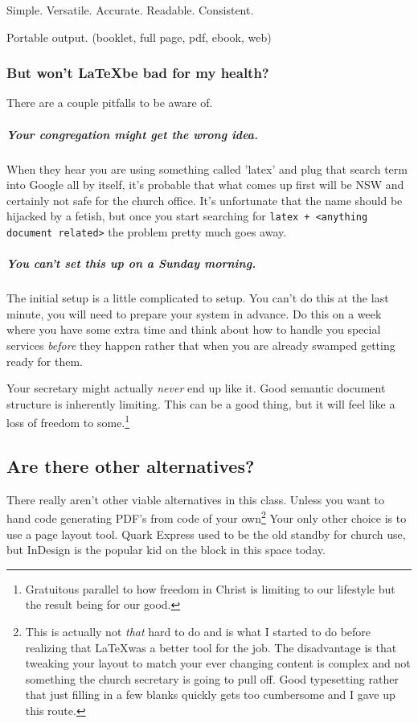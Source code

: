 \documentclass[12pt]{scrartcl}
\begin{document}
Simple. Versatile. Accurate. Readable. Consistent.

Portable output. (booklet, full page, pdf, ebook, web)

\subsubsection{But won't \LaTeX be bad for my health?}

There are a couple pitfalls to be aware of.

\subparagraph{Your congregation might get the wrong idea.}

When they hear you are using something called 'latex' and plug that search term
into Google all by itself, it's probable that what comes up first will be NSW
and certainly not safe for the church office. It's unfortunate that the name
should be hijacked by a fetish, but once you start searching for \texttt{latex +
	<anything document related>} the problem pretty much goes away.

\subparagraph{You can't set this up on a Sunday morning.}

The initial setup is a little complicated to setup. You can't do this at the
last minute, you will need to prepare your system in advance. Do this on a week
where you have some extra time and think about how to handle you special
services \emph{before} they happen rather that when you are already swamped
getting ready for them.

Your secretary might actually \emph{never} end up like it. Good semantic
document structure is inherently limiting. This can be a good thing, but it will
feel like a loss of freedom to some.\footnote{Gratuitous parallel to how freedom
	in Christ is limiting to our lifestyle but the result being for our
	good.}

\subsection{Are there other alternatives?}

There really aren't other viable alternatives in this class. Unless you want to
hand code generating PDF's from code of your own\footnote{This is actually not
	\emph{that} hard to do and is what I started to do before realizing that
	\LaTeX was a better tool for the job. The disadvantage is that tweaking
	your layout to match your ever changing content is complex and not
	something the church secretary is going to pull off. Good typesetting
	rather that just filling in a few blanks quickly gets too cumbersome and
	I gave up this route.} Your only other choice is to use a page layout
tool. Quark Express used to be the old standby for church use, but InDesign is
the popular kid on the block in this space today.
\end{document}
